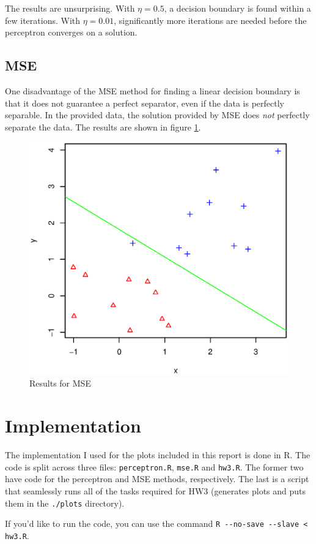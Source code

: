 \documentclass{article}
\begin{document}
The results are unsurprising. With $\eta=0.5$, a decision boundary is found
within a few iterations. With $\eta=0.01$, significantly more iterations are
needed before the perceptron converges on a solution.

\subsection{MSE}

One disadvantage of the MSE method for finding a linear decision boundary is
that it does not guarantee a perfect separator, even if the data is perfectly
separable. In the provided data, the solution provided by MSE does {\it not}
perfectly separate the data. The results are shown in figure \ref{plot:mse}.

\begin{figure}[htb]
	\centering
	\includegraphics[width=6.5in]{plots/mse.eps}
	\caption{Results for MSE}
	\label{plot:mse}
\end{figure}

\section{Implementation}

The implementation I used for the plots included in this report is done in R.
The code is split across three files: \verb|perceptron.R|, \verb|mse.R| and
\verb|hw3.R|. The former two have code for the perceptron and MSE methods,
respectively. The last is a script that seamlessly runs all of the tasks
required for HW3 (generates plots and puts them in the \verb|./plots|
directory).

If you'd like to run the code, you can use the command 
\verb|R --no-save --slave < hw3.R|.
\end{document}
